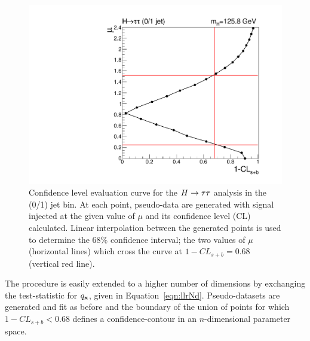 \begin{figure}
\begin{center}
\includegraphics[width=.7\textwidth]{combinations/confcurve_htt.pdf}
\end{center}
\caption{Confidence level evaluation curve for the $H\rightarrow\tau\tau$ analysis in the (0/1) jet bin. 
At each point, pseudo-data are generated with signal injected at the given value of $\mu$
and its confidence level (CL) calculated.
Linear interpolation between the generated points is used to determine the 68\% confidence 
interval; the two values of $\mu$ (horizontal lines) which cross the curve at $1-CL_{s+b}=0.68$
(vertical red line).}
\label{fig:confcontour}
\end{figure}
The procedure is easily extended to a higher number of dimensions
by exchanging the test-statistic for $q_{{\mathbf{x}}}$, given in Equation~\ref{eqn:llrNd}.
Pseudo-datasets are generated and fit as before and the boundary of the union of points for which
$1-CL_{s+b}<0.68$ defines a confidence-contour in an $n$-dimensional parameter space.


